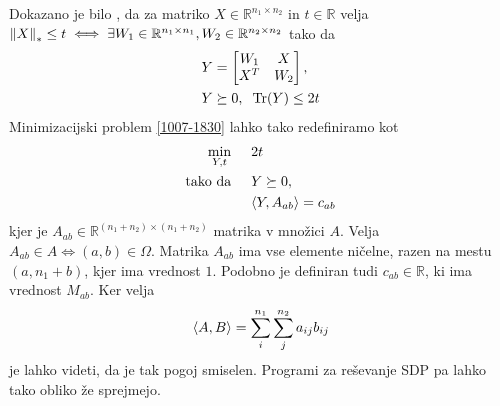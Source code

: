 Dokazano je bilo \cite{NNM-PHD}, da za matriko $X \in \mathbb{R}^{n_1 \times n_2}$ in $t \in \mathbb{R}$ 
velja $\left\lVert X\right\rVert_* \leq t \iff \exists W_1\in \mathbb{R}^{n_1 \times n_1}, W_2 \in \mathbb{R}^{n_2 \times n_2}$ tako da \cite{NNM-PHD}
\begin{align*}
    &Y = \begin{bmatrix}
        W_1 & X \\
        X^T & W_2 \label{1007-1835}
    \end{bmatrix}, \\
    &Y \succeq 0, \hspace{0.2cm} \text{Tr}(Y) \leq 2t
\end{align*} 
Minimizacijski problem \eqref{1007-1830} lahko tako redefiniramo kot 
\begin{align*}
    \min_{Y,t} \hspace{0.5cm} &2t\\
    \text{tako da} \hspace{0.5cm} & Y \succeq 0,\\
    &\langle Y, A_{ab} \rangle = c_{ab}
\end{align*} 
kjer je $A_{ab} \in \mathbb{R}^{(n_1 + n_2) \times (n_1 + n_2)}$ matrika v množici $A$. Velja 
$A_{ab} \in A \iff (a, b) \in \Omega$. Matrika $A_{ab}$ ima vse elemente ničelne, razen na mestu $(a, n_1 + b)$, kjer ima vrednost $1$.
Podobno je definiran tudi $c_{ab} \in \mathbb{R}$, ki ima vrednost $M_{ab}$.
Ker velja 
\[
    \langle A, B \rangle = \sum_{i}^{n_1} \sum_{j}^{n_2} a_{ij}b_{ij}
\] je lahko videti, da je tak pogoj smiselen. Programi za reševanje SDP pa lahko tako obliko že sprejmejo.
\cite{Survey-NKS19}



